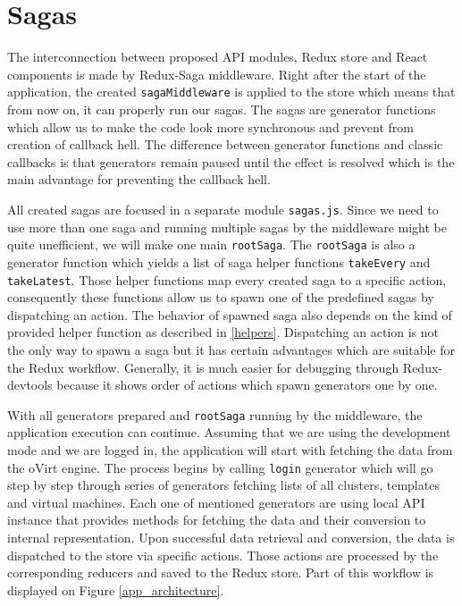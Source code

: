 \section{Sagas}
The interconnection between proposed API modules, Redux store and React components is made by Redux-Saga middleware. Right after the start of the application, the created \texttt{sagaMiddleware} is applied to the store which means that from now on, it can properly run our sagas. The sagas are generator functions which allow us to make the code look more synchronous and prevent from creation of callback hell. The difference between generator functions and classic callbacks is that generators remain paused until the effect is resolved which is the main advantage for preventing the callback hell.

All created sagas are focused in a separate module \texttt{sagas.js}. Since we need to use more than one saga and running multiple sagas by the middleware might be quite unefficient, we will make one main \texttt{rootSaga}. The \texttt{rootSaga} is also a generator function which yields a list of saga helper functions \texttt{takeEvery} and \texttt{takeLatest}. Those helper functions map every created saga to a specific action, consequently these functions allow us to spawn one of the predefined sagas by dispatching an action. The behavior of spawned saga also depends on the kind of provided helper function as described in \ref{helpers}. Dispatching an action is not the only way to spawn a saga but it has certain advantages which are suitable for the Redux workflow. Generally, it is much easier for debugging through Redux-devtools because it shows order of actions which spawn generators one by one.

With all generators prepared and \texttt{rootSaga} running by the middleware, the application execution can continue. Assuming that we are using the development mode and we are logged in, the application will start with fetching the data from the oVirt engine. The process begins by calling \texttt{login} generator which will go step by step through series of generators fetching lists of all clusters, templates and virtual machines. Each one of mentioned generators are using local API instance that provides methods for fetching the data and their conversion to internal representation. Upon successful data retrieval and conversion, the data is dispatched to the store via specific actions. Those actions are processed by the corresponding reducers and saved to the Redux store. Part of this workflow is displayed on 
Figure \ref{app_architecture}.

